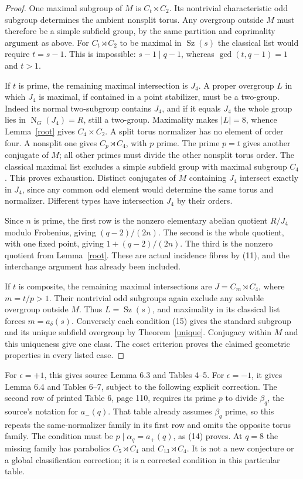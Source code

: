 \documentclass[11pt,a4paper]{article}
\newcommand{\Sz}{\operatorname{Sz}}
\newcommand{\N}{\operatorname{N}}
\begin{document}
\begin{proof}
One maximal subgroup of $M$ is $C_t\rtimes C_2$. Its nontrivial
characteristic odd subgroup determines the ambient nonsplit
torus. Any overgroup outside $M$ must therefore be a simple
subfield group, by the same partition and coprimality argument
as above. For $C_t\rtimes C_2$ to be maximal in $\Sz(s)$ the
classical list would require $t=s-1$. This is impossible:
$s-1\mid q-1$, whereas $\gcd(t,q-1)=1$ and $t>1$.

If $t$ is prime, the remaining maximal intersection is $J_4$.
A proper overgroup $L$ in which $J_4$ is maximal, if contained
in a point stabilizer, must be a two-group. Indeed its normal
two-subgroup contains $J_4$, and if it equals $J_4$ the whole
group lies in $\N_G(J_4)=R$, still a two-group. Maximality
makes $|L|=8$, whence Lemma~\ref{root} gives $C_4\times C_2$.
A split torus normalizer has no element of order four. A
nonsplit one gives $C_p\rtimes C_4$, with $p$ prime. The prime
$p=t$ gives another conjugate of $M$; all other primes must
divide the other nonsplit torus order. The classical maximal
list excludes a simple subfield group with maximal subgroup
$C_4$. This proves exhaustion. Distinct conjugates of $M$
containing $J_4$ intersect exactly in $J_4$, since any common
odd element would determine the same torus and normalizer.
Different types have intersection $J_4$ by their orders.

Since $n$ is prime, the first row is the nonzero elementary
abelian quotient $R/J_4$ modulo Frobenius, giving
$(q-2)/(2n)$. The second is the whole quotient, with one fixed
point, giving $1+(q-2)/(2n)$. The third is the nonzero quotient
from Lemma~\ref{root}. These are actual incidence fibres by
(11), and the interchange argument has already been included.

If $t$ is composite, the remaining maximal intersections are
$J=C_m\rtimes C_4$, where $m=t/p>1$. Their nontrivial odd
subgroups again exclude any solvable overgroup outside $M$.
Thus $L=\Sz(s)$, and maximality in its classical list forces
$m=a_\delta(s)$. Conversely each condition (15) gives the
standard subgroup and its unique subfield overgroup by
Theorem~\ref{unique}. Conjugacy within $M$ and this uniqueness
give one class. The coset criterion proves the claimed geometric
properties in every listed case.
\end{proof}

For $\epsilon=+1$, this gives source Lemma 6.3 and Tables 4--5.
For $\epsilon=-1$, it gives Lemma 6.4 and Tables 6--7, subject
to the following explicit correction. The second row of printed
Table 6, page 110, requires its prime $p$ to divide $\beta_q$,
the source's notation for $a_-(q)$. That table already assumes
$\beta_q$ prime, so this repeats the same-normalizer family in
its first row and omits the opposite torus family. The condition
must be $p\mid\alpha_q=a_+(q)$, as (14) proves. At $q=8$ the
missing family has parabolics $C_5\rtimes C_4$ and
$C_{13}\rtimes C_4$. It is not a new conjecture or a global
classification correction; it is a corrected condition in this
particular table.
\end{document}

